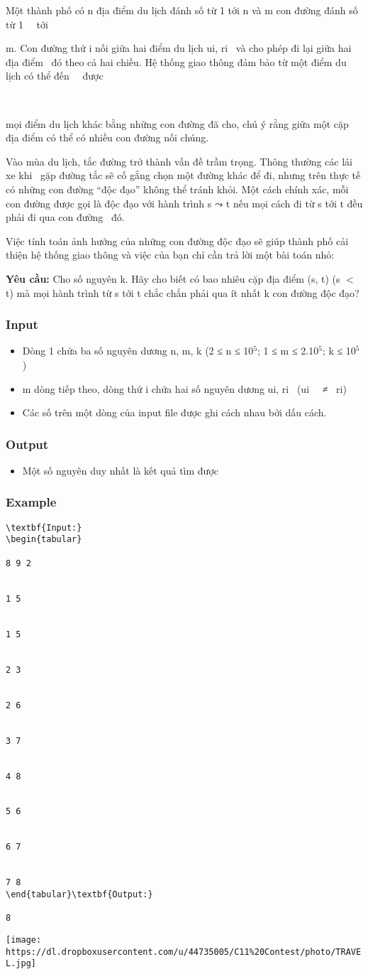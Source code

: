 

Một thành phố có n địa điểm du lịch đánh số từ 1 tới n và m con đường đánh số từ 1   tới

m. Con đường thứ i nối giữa hai điểm du lịch ui, ri  và cho phép đi lại giữa hai địa điểm  đó theo cả hai chiều. Hệ thống giao thông đảm bảo từ một điểm du lịch có thể đến   được

 

mọi điểm du lịch khác bằng những con đường đã cho, chú ý rằng giữa một cặp địa điểm có thể có nhiều con đường nối chúng.

Vào mùa du lịch, tắc đường trở thành vấn đề trầm trọng. Thông thường các lái xe khi  gặp đường tắc sẽ cố gắng chọn một đường khác để đi, nhưng trên thực tế có những con đường “độc đạo” không thể tránh khỏi. Một cách chính xác, mỗi con đường được gọi là độc đạo với hành trình s ⤳ t nếu mọi cách đi từ s tới t đều phải đi qua con đường  đó.

Việc tính toán ảnh hưởng của những con đường độc đạo sẽ giúp thành phố cải thiện hệ thống giao thông và việc của bạn chỉ cần trả lời một bài toán nhỏ:

\textbf{Yêu cầu: }Cho số nguyên k. Hãy cho biết có bao nhiêu cặp địa điểm (s, t) (s $<$ t) mà mọi hành trình từ s tới t chắc chắn phải qua ít nhất k con đường độc đạo?

\subsubsection{Input}
\begin{itemize}
	\item Dòng 1 chứa ba số nguyên dương n, m, k (2 ≤ n ≤ 10$^5$; 1 ≤ m ≤ 2.10$^5$; k ≤ 10$^5$)
	\item m dòng tiếp theo, dòng thứ i chứa hai số nguyên dương ui, ri  (ui   ≠  ri)
	\item Các số trên một dòng của input file được ghi cách nhau bởi dấu cách.
\end{itemize}

\subsubsection{Output}
\begin{itemize}
	\item Một số nguyên duy nhất là kết quả tìm được
\end{itemize}

\subsubsection{Example}
\begin{verbatim}
\textbf{Input:}
\begin{tabular}

8 9 2  


1 5  


1 5  


2 3  


2 6  


3 7  


4 8  


5 6  


6 7  


7 8
\end{tabular}\textbf{Output:}

8\end{verbatim}


\texttt{[image: https://dl.dropboxusercontent.com/u/44735005/C11\%20Contest/photo/TRAVEL.jpg]}
